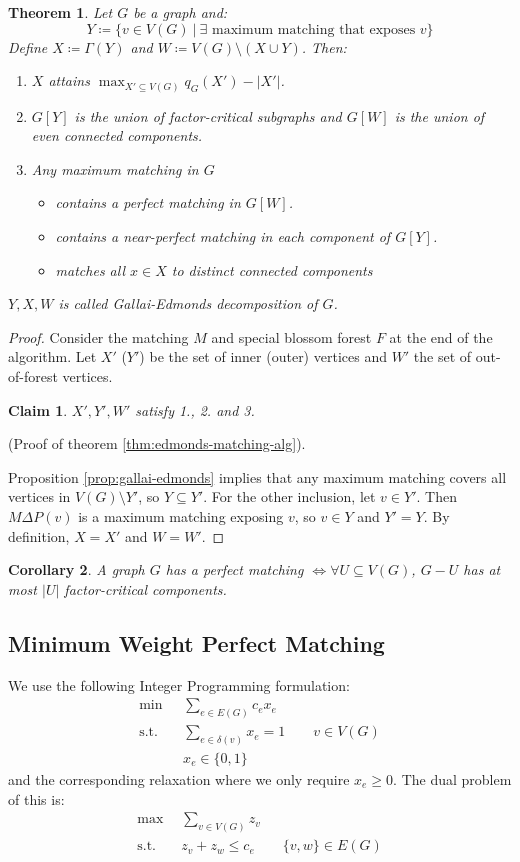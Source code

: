\documentclass[11pt, a4paper]{article}
\newcommand{\abs}[1]{\left\lvert#1\right\rvert}
\newcommand{\set}[1]{\{#1\}}
\newtheorem{theorem}{Theorem}[section]
\newtheorem{cor}[theorem]{Corollary}
\newtheorem*{claim}{Claim}
\theoremstyle{remark}
\theoremstyle{definition}
\begin{document}
\begin{theorem}
Let $G$ be a graph and:
\[
	Y\coloneqq\set{v\in V(G)\ |\ 
	\exists \text{ maximum matching that exposes } v}
\]
Define $X\coloneqq\Gamma(Y)$ and
$W\coloneqq V(G)\setminus \left(X\cup Y\right)$. Then:
\begin{enumerate}
	\item $X$ attains $\max_{X'\subseteq V(G)}q_G(X')-\abs{X'}$.
	\item $G[Y]$ is the union of factor-critical subgraphs and
	$G[W]$ is the union of even connected components.
	\item Any maximum matching in $G$
	\begin{itemize}
		\item contains a perfect matching in $G[W]$.
		\item contains a near-perfect matching in each component of $G[Y]$.
		\item matches all $x\in X$ to distinct connected components
	\end{itemize}
\end{enumerate}
$Y,X,W$ is called \emph{Gallai-Edmonds decomposition} of $G$.
\end{theorem}
\begin{proof}
Consider the matching $M$ and special blossom forest $F$ at the end
of the algorithm. Let $X'$ ($Y'$) be the set of inner (outer) vertices
and $W'$ the set of out-of-forest vertices.
\begin{claim}
$X',Y',W'$ satisfy 1., 2. and 3.
\end{claim}
(Proof of theorem \ref{thm:edmonds-matching-alg}).

Proposition \ref{prop:gallai-edmonds} implies that any maximum matching
covers all vertices in $V(G)\setminus Y'$, so $Y\subseteq Y'$. For
the other inclusion, let $v\in Y'$. Then $M\Delta P(v)$ is a maximum
matching exposing $v$, so $v\in Y$ and $Y'=Y$. By definition, $X=X'$
and $W=W'$.
\end{proof}

\begin{cor}
A graph $G$ has a perfect matching $\Leftrightarrow \forall U\subseteq V(G)$,
$G-U$ has at most $\abs{U}$ factor-critical components.
\end{cor}


\subsection{Minimum Weight Perfect Matching}
We use the following Integer Programming formulation:
\begin{align*}
	\min &\sum_{e\in E(G)}c_ex_e \\
	\text{s.t.}\quad &\sum_{e\in\delta(v)}x_e=1 \qquad v\in V(G) \\
	&x_e\in\set{0,1}
\end{align*}
and the corresponding relaxation where we only require $x_e\geq0$. The
dual problem of this is:
\begin{align*}
	\max &\sum_{v\in V(G)}z_v \\
	\text{s.t.}\quad &z_v+z_w\leq c_e \qquad \set{v,w}\in E(G)
\end{align*}
\end{document}
